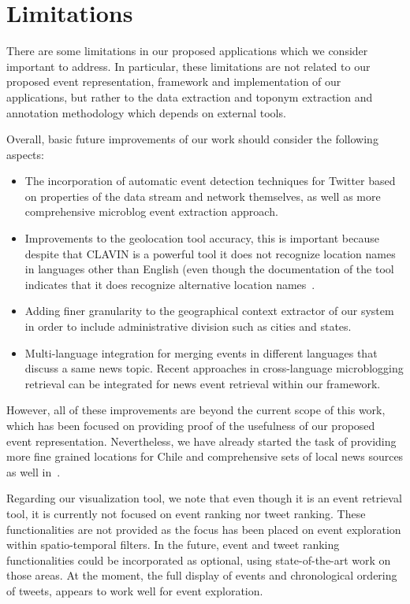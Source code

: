 \section{Limitations}\label{sec:geo:limitations}

There are some limitations in our proposed applications which we consider
important to address. In particular, these limitations are not related to our
proposed event representation, framework and implementation of our applications,
but rather to the data extraction and toponym extraction and annotation
methodology which depends on external tools.

Overall, basic future improvements of our work should consider the following
aspects:

\begin{itemize}
\item The incorporation of automatic event detection techniques for Twitter
based on properties of the data stream and network themselves, as well as more
comprehensive microblog event extraction approach. 
\item Improvements to the geolocation tool accuracy, this is important because
despite that CLAVIN is a powerful tool it does not recognize location names in
languages other than English (even though the documentation of the tool
indicates that it does recognize alternative location names~\cite{clavin}.
\item Adding finer granularity to the geographical context extractor of our
system in order to include administrative division such as cities and states.
\item Multi-language integration for merging events in different languages that
discuss a same news topic. Recent approaches in cross-language microblogging
retrieval \cite{Godavarthy2016} can be integrated for news event retrieval
within our framework.
\end{itemize}

However, all of these improvements are beyond the current scope of this work,
which has been focused on providing proof of the usefulness of our proposed
event representation. Nevertheless, we have already started the task of
providing more fine grained locations for Chile and comprehensive sets of local
news sources as well in~\cite{maldonado_2015}.

Regarding our visualization tool, we note that even though it is an event
retrieval tool, it is currently not focused on event ranking nor tweet ranking.
These functionalities are not provided as the focus has been placed on event
exploration within spatio-temporal filters. In the future, event and tweet
ranking functionalities could be incorporated as optional, using
state-of-the-art work on those areas. At the moment, the full display of events
and chronological ordering of tweets, appears to work well for event
exploration.
